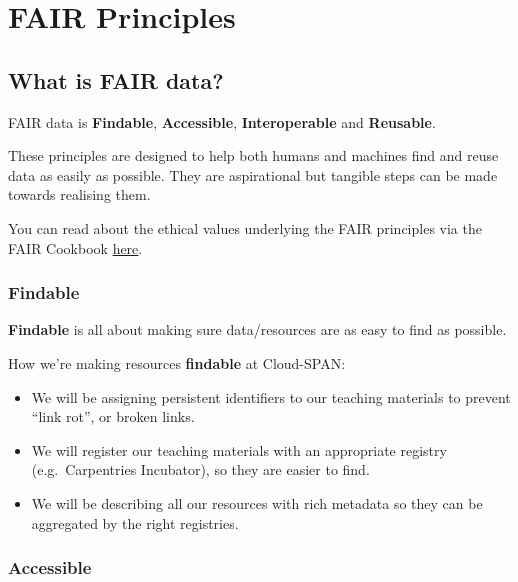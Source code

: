 \documentclass[
]{book}
\providecommand{\tightlist}{%
  \setlength{\itemsep}{0pt}\setlength{\parskip}{0pt}}
\begin{document}
\hypertarget{fair-principles}{%
\chapter{FAIR Principles}\label{fair-principles}}

\hypertarget{what-is-fair-data}{%
\section{What is FAIR data?}\label{what-is-fair-data}}

FAIR data is \textbf{Findable}, \textbf{Accessible}, \textbf{Interoperable} and \textbf{Reusable}.

These principles are designed to help both humans and machines find and reuse data as easily as possible. They are aspirational but tangible steps can be made towards realising them.

You can read about the ethical values underlying the FAIR principles via the FAIR Cookbook \href{https://fairplus.github.io/the-fair-cookbook/content/recipes/introduction/FAIRplus-values.html}{here}.

\hypertarget{findable}{%
\subsection*{Findable}\label{findable}}

\textbf{Findable} is all about making sure data/resources are as easy to find as possible.

How we're making resources \textbf{findable} at Cloud-SPAN:

\begin{itemize}
\tightlist
\item
  We will be assigning persistent identifiers to our teaching materials to prevent ``link rot'', or broken links.
\item
  We will register our teaching materials with an appropriate registry (e.g.~Carpentries Incubator), so they are easier to find.
\item
  We will be describing all our resources with rich metadata so they can be aggregated by the right registries.
\end{itemize}

\hypertarget{accessible}{%
\subsection*{Accessible}\label{accessible}}
\end{document}
